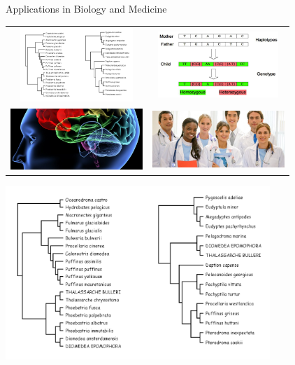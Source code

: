 \documentclass{cons-beamer}
\begin{document}
\begin{frame}{Applications in Biology and Medicine}
  \begin{tabular}{CC}
     \newline
    \includegraphics[height=28mm]{images/seabirds}
    &
     \newline
    \includegraphics[height=25mm]{images/genotype-haplotype}
    \\[+8mm]
     \newline
    \includegraphics[width=50mm]{images/medical}
    &
     \newline
    \includegraphics[width=50mm]{images/physicians}
  \end{tabular}
\end{frame}

\begin{frame}
  \begin{example}
    \centering
    \includegraphics[width=100mm]{images/seabirds.pdf}
  \end{example}
\end{frame}
\end{document}
